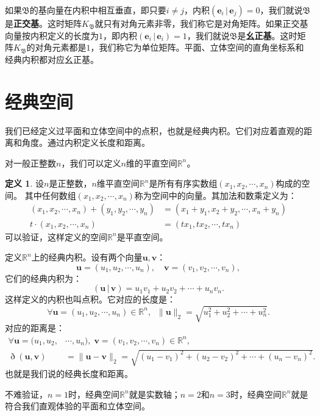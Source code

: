 \documentclass[12pt,UTF8]{ctexbook}
\newcommand{\nji}[2]{\displaystyle\left( #1 \,|\, #2\right)}
\theoremstyle{definition}
\newtheorem{df}{定义}[section]
\theoremstyle{plain}
\begin{document}
如果$\mathfrak{B}$的基向量在内积中相互垂直，即只要$i\neq j$，内积$\nji{\mathbf{e}_i}{\mathbf{e}_j} = 0$，我们就说$\mathfrak{B}$是\textbf{正交基}。这时矩阵$K_{\mathfrak{B}}$就只有对角元素非零，我们称它是对角矩阵。如果正交基向量按内积定义的长度为$1$，即内积$\nji{\mathbf{e}_i}{\mathbf{e}_i} = 1$，我们就说$\mathfrak{B}$是\textbf{幺正基}。这时矩阵$K_{\mathfrak{B}}$的对角元素都是$1$，我们称它为单位矩阵。平面、立体空间的直角坐标系和经典内积都对应幺正基。

\section{经典空间}

我们已经定义过平面和立体空间中的点积，也就是经典内积。它们对应着直观的距离和角度。通过内积定义长度和距离。

对一般正整数$n$，我们可以定义$n$维的平直空间$\mathbb{R}^n$。
\begin{df}
    设$n$是正整数，$n$维平直空间$\mathbb{R}^n$是所有有序实数组$(x_1, x_2, \cdots, x_n)$构成的空间。
    其中任何数组$(x_1, x_2, \cdots, x_n)$称为空间中的向量。其加法和数乘定义为：
    \begin{align*}
        (x_1, x_2, \cdots, x_n) + (y_1, y_2, \cdots, y_n) &= (x_1 + y_1, x_2 + y_2, \cdots, x_n + y_n) \\
        t\cdot (x_1, x_2, \cdots, x_n) &= (tx_1, tx_2, \cdots, t x_n)
    \end{align*}
    可以验证，这样定义的空间$\mathbb{R}^n$是平直空间。

    定义$\mathbb{R}^n$上的经典内积。设有两个向量$\mathbf{u}, \mathbf{v}$：
    $$ \mathbf{u} = (u_1, u_2, \cdots, u_n), \quad  \mathbf{v} = (v_1, v_2, \cdots, v_n), $$
    它们的经典内积为：
    $$ \nji{\mathbf{u}}{\mathbf{v}} = u_1v_1 + u_2v_2 + \cdots + u_n v_n.$$
    这样定义的内积也叫点积。它对应的长度是：
    $$ \forall \mathbf{u} = (u_1, u_2, \cdots, u_n) \in \mathbb{R}^n, \;\; \| \mathbf{u}\|_2 = \sqrt{u_1^2 + u_2^2 + \cdots + u_n^2} .$$
    对应的距离是：
    \begin{align*}
        \forall \mathbf{u} = (u_1, u_2, &\cdots, u_n), \; \mathbf{v} = (v_1, v_2, \cdots, v_n) \in \mathbb{R}^n, \\
        \eth(\mathbf{u}, \mathbf{v}) &= \| \mathbf{u} - \mathbf{v}\|_2 = \sqrt{(u_1 - v_1)^2 + (u_2 - v_2)^2 + \cdots + (u_n - v_n)^2} .
    \end{align*}
    也就是我们说的经典长度和距离。
\end{df}
不难验证，$n=1$时，经典空间$\mathbb{R}^n$就是实数轴；$n=2$和$n=3$时，经典空间$\mathbb{R}^n$就是符合我们直观体验的平面和立体空间。
\end{document}
